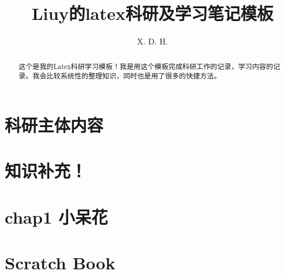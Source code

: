 \documentclass[12pt]{report}
\begin{document}
\title{\boldmath Liuy的latex科研及学习笔记模板}
\author{X. D. H.}

\maketitle

\begin{abstract}
  这个是我的Latex科研学习模板！我是用这个模板完成科研工作的记录，学习内容的记录。我会比较系统性的整理知识，同时也是用了很多的快捷方法。 
\end{abstract}

\tableofcontents

\chapter{科研主体内容}


\chapter{知识补充！}


\chapter{chap1 小呆花}\label{chap:chap1} %


\chapter{Scratch Book}

\end{document}
